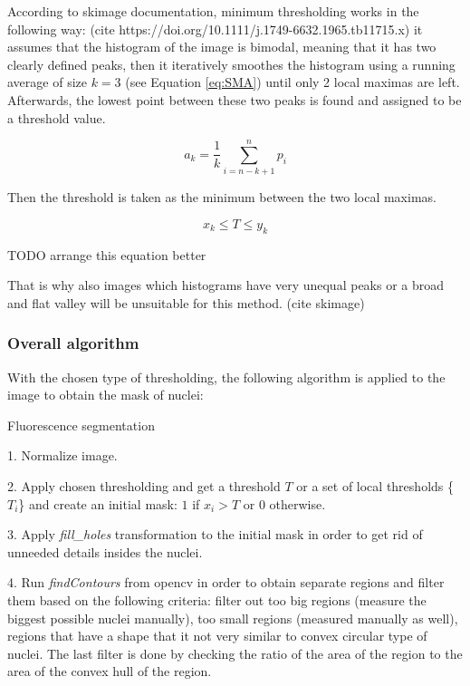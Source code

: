 According to skimage documentation, minimum thresholding works in the following way: (cite  https://doi.org/10.1111/j.1749-6632.1965.tb11715.x) it assumes that the histogram of the image is bimodal, meaning that it has two clearly defined peaks, then it iteratively smoothes the histogram using a running average of size $k=3$ (see Equation \ref{eq:SMA}) until only 2 local maximas are left. Afterwards, the lowest point between these two peaks is found and assigned to be a threshold value.

\begin{equation}
    a_k = \frac{1}{k}\sum_{i=n-k + 1}^{n}p_i
\label{eq:SMA}
\end{equation}

Then the threshold is taken as the minimum between the two local maximas.

\begin{equation}
    x_k \leq T \leq y_k
\end{equation}

TODO arrange this equation better

That is why also images which histograms have very unequal peaks or a broad and flat valley will be unsuitable for this method. (cite skimage)

\subsubsection{Overall algorithm}
With the chosen type of thresholding, the following algorithm is applied to the image to obtain the mask of nuclei:

\begin{algorithm}
    \caption{Fluorescence segmentation}\label{alg:global-thresholding}
    \begin{algorithmic}
    \item 1. Normalize image.
    \item 2. Apply chosen thresholding and get a threshold $T$ or a set of local thresholds \{$T_i$\} and create an initial mask: $1$ if $x_i > T$ or $0$ otherwise.  
    \item 3. Apply \textit{fill\_holes} transformation to the initial mask in order to get rid of unneeded details insides the nuclei.
    \item 4. Run \textit{findContours} from opencv in order to obtain separate regions and filter them based on the following criteria: filter out too big regions (measure the biggest possible nuclei manually), too small regions (measured manually as well), regions that have a shape that it not very similar to convex circular type of nuclei. The last filter is done by checking the ratio of the area of the region to the area of the convex hull of the region. 
    \end{algorithmic}
\end{algorithm}    

